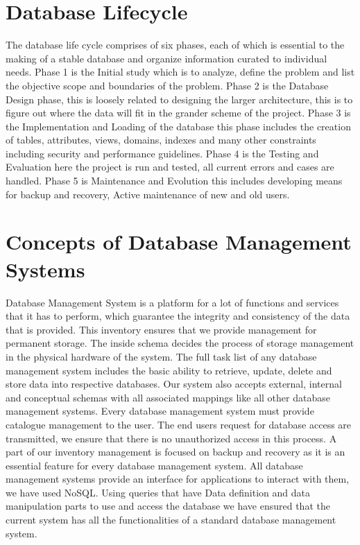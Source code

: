 \documentclass[BTech]{srmuthesis}
\begin{document}
\section{Database Lifecycle}
The database life cycle comprises of six phases, each of which is essential to the making of a stable database and organize information curated to individual needs. Phase 1 is the Initial study which is to analyze, define the problem and list the objective scope and boundaries of the problem. Phase 2 is the Database Design phase, this is loosely related to designing the larger architecture, this is to figure out where the data will fit in the grander scheme of the project. Phase 3 is the Implementation and Loading of the database this phase includes the creation of tables, attributes, views, domains, indexes and many other constraints including security and performance guidelines. Phase 4 is the Testing and Evaluation here the project is run and tested, all current errors and cases are handled. Phase 5 is Maintenance and Evolution this includes developing means for backup and recovery, Active maintenance of new and old users. \cite{data_managemenet_life_cycle}
\section{Concepts of Database Management Systems}
Database Management System is a platform for a lot of functions and services that it has to perform, which guarantee the integrity and consistency of the data that is provided. This inventory ensures that we provide management for permanent storage. The inside schema decides the process of storage management in the physical hardware of the system. The full task list of any database management system includes the basic ability to retrieve, update, delete and store data into respective databases. Our system also accepts external, internal and conceptual schemas with all associated mappings like all other database management systems. Every database management system must provide catalogue management to the user. The end users request for database access are transmitted, we ensure that there is no unauthorized access in this process. A part of our inventory management is focused on backup and recovery as it is an essential feature for every database management system. All database management systems provide an interface for applications to interact with them, we have used NoSQL. Using queries that have Data definition and data manipulation parts to use and access the database we have ensured that the current system has all the functionalities of a standard database management system. \cite{concept_of_database_mngmt}
\end{document}
